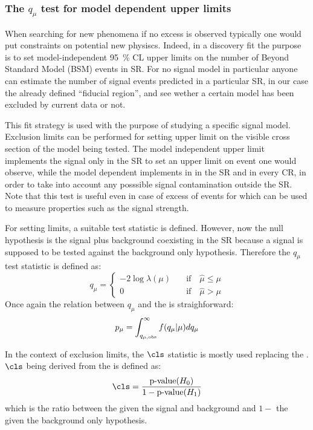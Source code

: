 \subsubsection{The $q_\mu$ test for model dependent upper limits}
When searching for new phenomena if no excess is observed typically one would put constraints on potential new physiscs. Indeed, in a discovery fit the purpose is to set model-independent \SI{95}{\percent} CL upper limits on the number of Beyond Standard Model (BSM) events in SR. For no signal model in particular anyone can estimate the number of signal events predicted in a particular SR, in our case the already defined ``fiducial region'', and see wether a certain model has been excluded by current data or not.

This fit strategy is used with the purpose of studying a specific signal model. Exclusion limits can be performed for setting upper limit on the visible cross section of the model being tested. The model independent upper limit implements the signal only in the SR to set an upper limit on event one would observe, while the model dependent implements in in the SR and in every CR, in order to take into account any posssible signal contamination outside the SR. Note that this test is useful even in case of excess of events for which can be used to measure properties such as the signal strength.

For setting limits, a suitable test statistic is defined. However, now the null hypothesis is the signal plus background coexisting in the SR because a signal is supposed to be tested against the background only hypothesis. Therefore the $q_\mu$ test statistic is defined as:
\begin{equation}
q_\mu=
\left\{
\begin{aligned}
-2\log{\lambda(\mu)}\quad &\text{if}\quad \hat{\mu}\le\mu\\
 0 \qquad&\text{if}\quad \hat{\mu}>\mu
\end{aligned}
\right.
\end{equation} 
Once again the relation between $q_\mu$ and the \p is straighforward:
\begin{equation}
 p_{\mu}=\int_{q_{\mu,\textup{obs}}}^\infty f(q_\mu \vert \mu) dq_\mu
 \label{eqn:pdaqmu}
\end{equation}

In the context of exclusion limits, the $\cls$ statistic is mostly used replacing the \p. $\cls$ being derived from the \p is defined as:
\begin{equation}
	\cls=\frac{\text{p-value}(H_0)}{1-\text{p-value}(H_1)}
\end{equation}
which is the ratio between the \p given the signal and background and $1-$ the \p given the background only hypothesis.


